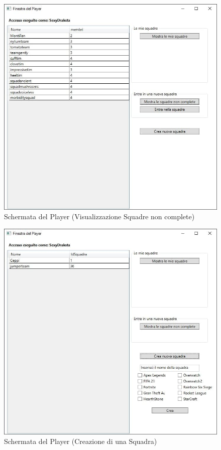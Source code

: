\documentclass[a4paper,12pt]{report}
\begin{document}
\begin{figure}[!htb]
	\centerline{\includegraphics[scale=0.85]{img/player_squadre_non_complete.jpg}}
	\caption{Schermata del Player (Visualizzazione Squadre non complete)}
	\label{img:player_squadre_non_complete}
\end{figure}

\begin{figure}[!htb]
	\centerline{\includegraphics[scale=0.85]{img/player_crea_squadra.jpg}}
	\caption{Schermata del Player (Creazione di una Squadra)}
	\label{img:player_crea_squadra}
\end{figure}
\end{document}
